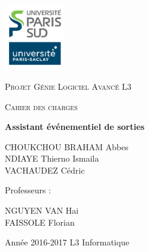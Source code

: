 \documentclass[a4paper, 12pt, notitlepage]{article} %
\begin{document}
\begin{titlepage}
	\centering
	\includegraphics[width=0.2\textwidth]{LogoUPSUD_ParisSaclay.jpg}\par\vspace{1cm}
	{\scshape\large Projet Génie Logiciel Avancé L3 \par}
	\vspace{1cm}
	{\scshape\large Cahier des charges\par}
	\vspace{1.5cm}
	{\huge\bfseries Assistant événementiel de sorties\par}
	\vspace{2cm}
	{\large CHOUKCHOU BRAHAM Abbes \\
					NDIAYE Thierno Ismaila\\
					VACHAUDEZ Cédric\par}

	\vfill

	Professeurs :\par NGUYEN VAN Hai\\FAISSOLE Florian

	\vfill

	{\large Année 2016-2017 L3 Informatique\par\par}
\end{titlepage}

{
\setlength{\parskip}{0 ex}
\tableofcontents
\thispagestyle{empty}
\newpage

\listofmaquetteFig
\vspace{1cm}
\listofumlFig
\thispagestyle{empty}
}
\newpage
{}


\newpage
{}
\end{document}

